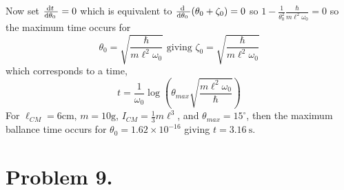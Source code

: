 \documentclass[12pt]{extarticle}
\begin{document}
\begin{enumerate}
Now set $\frac{\mathrm{d}t \:}{\mathrm{d}\theta_0 \:} = 0$ which is equivalent to $\frac{\mathrm{d} \:}{\mathrm{d}\theta_0 \:} (\theta_0 + \zeta_0) = 0$ so $1 - \frac{1}{\theta_0^2}\frac{\hbar}{m \ell^2 \omega_0} = 0$ so the maximum time occurs for \[\theta_0 = \sqrt{\frac{\hbar}{m \ell^2 \omega_0}} \text{  giving  } \zeta_0 = \sqrt{\frac{\hbar}{m \ell^2 \omega_0}} \]
which corresponds to a time, \[t = \frac{1}{\omega_0} \log{\left(\theta_{max} \sqrt{\frac{m \ell^2 \omega_0}{\hbar}} \right)} \] 
For $\ell_{CM} = 6 \mathrm{cm}$, $m = 10 \mathrm{g}$, $I_{CM} = \frac{1}{3} m \ell^3$, and $\theta_{max} = 15^\circ$, then the maximum ballance time occurs for $\theta_0 = 1.62 \times 10^{-16}$ giving $t = 3.16 \: \mathrm{s}$.

\end{enumerate}

\section*{Problem 9.}
\end{document}
